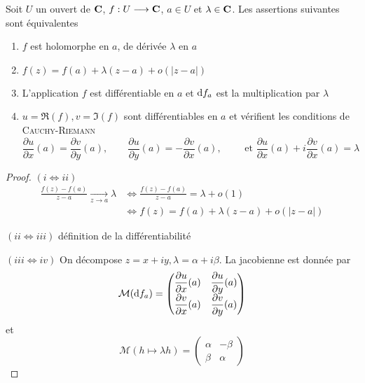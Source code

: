 \begin{prop}
    Soit $U$ un ouvert de  $ \mathbf C$, $f:U \longrightarrow \mathbf C$, $a \in  U$ et $\lambda \in  \mathbf C$. Les assertions suivantes sont équivalentes \begin{enumerate}[label=(\emph{\roman*})]
    \item $f$ est holomorphe en  $a$, de dérivée  $\lambda$ en $a$
    \item $f(z)=f(a)+\lambda (z-a)+o(|z-a|)$
    \item L'application  $f$ est différentiable en  $a$ et  $\mathop{}\!\mathrm d f_a$ est la multiplication par  $\lambda$ 
    \item $u=\Re(f), v=\Im(f)$ sont différentiables en  $a$ et vérifient les conditions de \textsc{Cauchy-Riemann}  \[
            \frac{\partial u}{\partial x}(a)= \frac{\partial v}{\partial y}(a), \qquad  \frac{\partial u}{\partial y}(a)=-\frac{\partial v}{\partial x}(a), \qquad \text{ et } \frac{\partial u}{\partial x}(a)+i \frac{\partial v}{\partial x}(a)=\lambda
    \] 
\end{enumerate}
\end{prop}

\begin{proof}
    $(i \iff   ii)$ \begin{align*}
        \frac{f(z)-f(a)}{z-a}\xrightarrow[z\to a]{} \lambda &\iff \frac{f(z)-f(a)}{z-a}=\lambda+o(1) \\
                                                            & \iff  f(z)=f(a)+ \lambda(z-a)+o(|z-a|)
    \end{align*}

    $(ii \iff  iii)$ définition de la différentiabilité

    $(iii \iff  iv)$ On décompose $z=x+iy, \lambda=\alpha+i\beta$. La jacobienne est donnée par \[
        \mathcal  M(\mathop{}\!\mathrm d f_a)=
        \begin{pmatrix}
            \displaystyle \frac{\partial u}{\partial x}(a) & \displaystyle \frac{\partial u}{\partial y}(a) \\
            \displaystyle \frac{\partial v}{\partial x}(a) & \displaystyle \frac{\partial v}{\partial y}(a) 
        \end{pmatrix}
    \] et \[
    \mathcal  M(h\longmapsto \lambda h) =
    \begin{pmatrix}
        \alpha & -\beta \\
        \beta & \alpha
    \end{pmatrix}
    \]
\end{proof}

